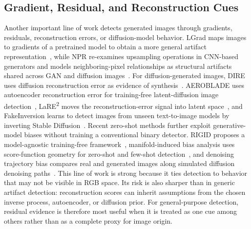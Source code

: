 \documentclass[lettersize,journal]{IEEEtran}
\begin{document}
\subsection{Gradient, Residual, and Reconstruction Cues}
Another important line of work detects generated images through gradients, residuals, reconstruction errors, or diffusion-model behavior. LGrad maps images to gradients of a pretrained model to obtain a more general artifact representation~\cite{tan2023lgrad}, while NPR re-examines upsampling operations in CNN-based generators and models neighboring-pixel relationships as structural artifacts shared across GAN and diffusion images~\cite{tan2024npr}. For diffusion-generated images, DIRE uses diffusion reconstruction error as evidence of synthesis~\cite{wang2023dire}. AEROBLADE uses autoencoder reconstruction error for training-free latent-diffusion image detection~\cite{ricker2024aeroblade}, LaRE\textsuperscript{2} moves the reconstruction-error signal into latent space~\cite{luo2024lare2}, and FakeInversion learns to detect images from unseen text-to-image models by inverting Stable Diffusion~\cite{cazenavette2024fakeinversion}. Recent zero-shot methods further exploit generative-model biases without training a conventional binary detector. RIGID proposes a model-agnostic training-free framework~\cite{he2024rigid}, manifold-induced bias analysis uses score-function geometry for zero-shot and few-shot detection~\cite{brokman2025manifold}, and denoising trajectory bias compares real and generated images along simulated diffusion denoising paths~\cite{liang2025trajectory}. This line of work is strong because it ties detection to behavior that may not be visible in RGB space. Its risk is also sharper than in generic artifact detection: reconstruction scores can inherit assumptions from the chosen inverse process, autoencoder, or diffusion prior. For general-purpose detection, residual evidence is therefore most useful when it is treated as one cue among others rather than as a complete proxy for image origin.
\end{document}
